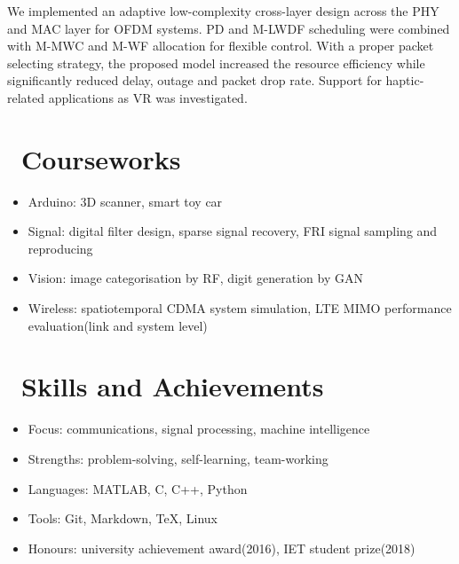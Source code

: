 \documentclass{resume}
\begin{document}
We implemented an adaptive low-complexity cross-layer design across the PHY and MAC layer for OFDM systems. PD and M-LWDF scheduling were combined with M-MWC and M-WF allocation for flexible control. With a proper packet selecting strategy, the proposed model increased the resource efficiency while significantly reduced delay, outage and packet drop rate. Support for haptic-related applications as VR was investigated.

\section{\faTasks\ Courseworks}

\begin{itemize}[noitemsep,nolistsep]
  \item Arduino: 3D scanner, smart toy car
  \item Signal: digital filter design, sparse signal recovery, FRI signal sampling and reproducing
  \item Vision: image categorisation by RF, digit generation by GAN
  \item Wireless: spatiotemporal CDMA system simulation, LTE MIMO performance evaluation(link and system level)
\end{itemize}

\section{\faHeartO\ Skills and Achievements}

\begin{itemize}[noitemsep,nolistsep]
  \item Focus: communications, signal processing, machine intelligence
  \item Strengths: problem-solving, self-learning, team-working
  \item Languages: MATLAB, C, C++, Python
  \item Tools: Git, Markdown, TeX, Linux
  \item Honours: university achievement award(2016), IET student prize(2018)
\end{itemize}


%
%
\end{document}
